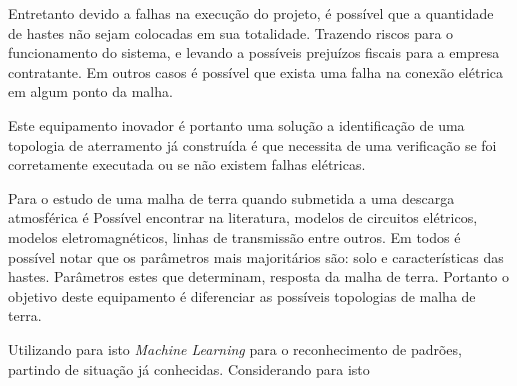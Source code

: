 \documentclass[a4paper, 10pt]{article}
\begin{document}
Entretanto devido a falhas na execução do projeto, é possível que a quantidade
de hastes não sejam colocadas em sua totalidade. Trazendo riscos para o 
funcionamento do sistema, e levando a possíveis prejuízos fiscais para a 
empresa contratante. Em outros casos é possível que exista uma falha na 
conexão elétrica em algum ponto da malha.

Este equipamento inovador é portanto uma solução a identificação de uma topologia
de aterramento já construída é que necessita de uma verificação se foi corretamente
executada ou se não existem falhas elétricas.

Para o estudo de uma malha de terra quando submetida a uma descarga atmosférica 
é Possível encontrar na literatura, modelos de circuitos elétricos, modelos 
eletromagnéticos, linhas de transmissão entre outros. Em todos é possível notar 
que os parâmetros mais majoritários são: solo e características das hastes. 
Parâmetros estes que determinam, resposta da malha de terra. Portanto o objetivo
deste equipamento é diferenciar as possíveis topologias de malha de terra. 

Utilizando para isto \textit{Machine Learning} para o reconhecimento de padrões, 
partindo de situação já conhecidas. Considerando para isto  
\end{document}
